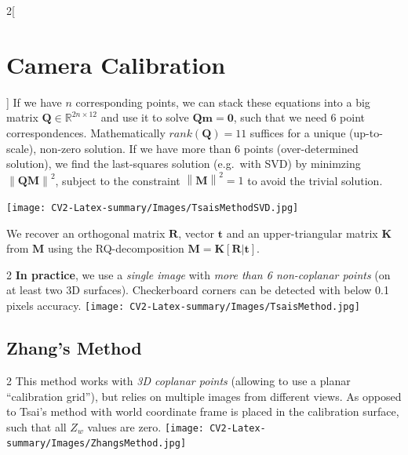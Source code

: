 \documentclass[oneside,fontsize=11pt,paper=a4]{scrartcl}
\newcommand\norm[1]{\left\lVert#1\right\rVert}
\newenvironment{myfigure}
  {\par\medskip\noindent\minipage{\linewidth}}
  {\endminipage\par\medskip}
\begin{document}
\begin{multicols}{2}[\section{Camera Calibration}]
If we have $n$ corresponding points, we can stack these equations into a big matrix $\mathbf{Q}\in\mathbb{R}^{2n\times12}$ and use it to solve $\mathbf{Q}\mathbf{m}=\mathbf{0}$, such that we need 6 point correspondences. Mathematically $rank(\mathbf{Q})=11$ suffices for a unique (up-to-scale), non-zero solution. If we have more than 6 points (over-determined solution), we find the last-squares solution (e.g.\ with SVD) by minimzing $\norm{\mathbf{QM}}^2$, subject to the constraint $\norm{\mathbf{M}}^2=1$ to avoid the trivial solution. 

\begin{myfigure}
    \texttt{[image: CV2-Latex-summary/Images/TsaisMethodSVD.jpg]}
\end{myfigure}

We recover an orthogonal matrix $\mathbf{R}$, vector $\mathbf{t}$ and an upper-triangular matrix $\mathbf{K}$ from $\mathbf{M}$ using the RQ-decomposition $\mathbf{M}=\mathbf{K}[\mathbf{R}\vert\mathbf{t}]$.
 
\begin{multicols}{2}
    \textbf{In practice}, we use a \textit{single image} with \textit{more than 6 non-coplanar points} (on at least two 3D surfaces). Checkerboard corners can be detected with below 0.1 pixels accuracy.
    \texttt{[image: CV2-Latex-summary/Images/TsaisMethod.jpg]}
\end{multicols}

\subsection{Zhang's Method}

\begin{multicols}{2}
    This method works with \textit{3D coplanar points} (allowing to use a planar ``calibration grid''), but relies on multiple images from different views. As opposed to Tsai's method with world coordinate frame is placed in the calibration surface, such that all $Z_w$ values are zero.
    \texttt{[image: CV2-Latex-summary/Images/ZhangsMethod.jpg]}
\end{multicols} 


\end{multicols}
\end{document}
